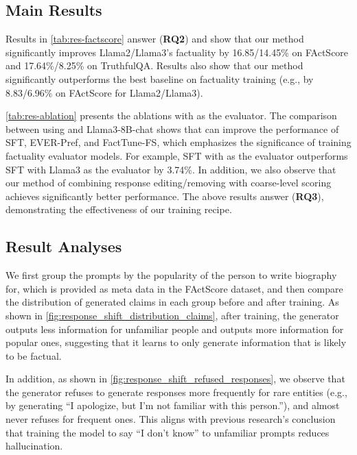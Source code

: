 \subsection{Main Results}
Results in \autoref{tab:res-factscore} answer (\textbf{RQ2}) and show that our method significantly improves Llama2/Llama3's factuality by 16.85/14.45\% on FActScore and 17.64\%/8.25\% on TruthfulQA.
Results also show that our method significantly outperforms the best baseline on factuality training (e.g., by 8.83/6.96\% on FActScore for Llama2/Llama3).

\autoref{tab:res-ablation} presents the ablations with \fencemodelname as the evaluator.
The comparison between using \fencemodelname and Llama3-8B-chat shows that \fencemodelname can improve the performance of SFT, EVER-Pref, and FactTune-FS, which emphasizes the significance of training factuality evaluator models.
For example, SFT with \fencemodelname as the evaluator outperforms SFT with Llama3 as the evaluator by 3.74\%.
In addition, we also observe that our method of combining response editing/removing with coarse-level scoring achieves significantly better performance.
The above results answer (\textbf{RQ3}), demonstrating the effectiveness of our training recipe.






\subsection{Result Analyses}

We first group the prompts by the popularity of the person to write biography for, which is provided as meta data in the FActScore dataset, and then compare the distribution of generated claims in each group before and after training.
As shown in \autoref{fig:response_shift_distribution_claims}, after training, the generator outputs less information for unfamiliar people and outputs more information for popular ones, suggesting that it learns to only generate information that is likely to be factual.

In addition, as shown in \autoref{fig:response_shift_refused_responses}, we observe that the generator refuses to generate responses more frequently for rare entities (e.g., by generating ``I apologize, but I'm not familiar with this person.''), and almost never refuses for frequent ones. 
This aligns with previous research's conclusion~\citep{unfamiliar-finetuning} that training the model to say ``I don't know'' to unfamiliar prompts reduces hallucination.


